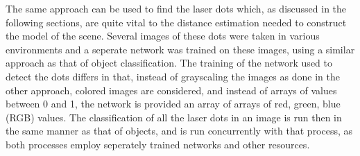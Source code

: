 The same approach can be used to find the laser dots which, as discussed in the following sections, are quite vital to the distance estimation needed to construct the model of the scene. Several images of these dots were taken in various environments and a seperate network was trained on these images, using a similar approach as that of object classification. The training of the network used to detect the dots differs in that, instead of grayscaling the images as done in the other approach, colored images are considered, and instead of arrays of values between 0 and 1, the network is provided an array of arrays of red, green, blue (RGB) values. The classification of all the laser dots in an image is run then in the same manner as that of objects, and is run concurrently with that process, as both processes employ seperately trained networks and other resources.